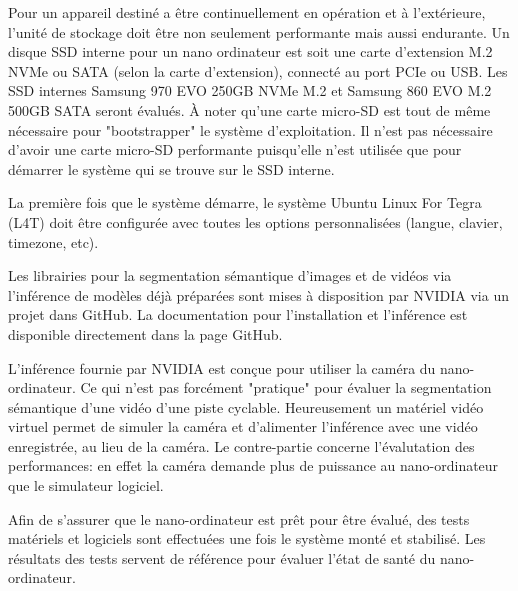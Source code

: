 \par Pour un appareil destiné a être continuellement en opération et à l'extérieure, l'unité de stockage doit être non seulement performante mais aussi endurante. Un disque SSD interne pour un nano ordinateur est soit une carte d'extension M.2 NVMe ou SATA (selon la carte d'extension), connecté au port PCIe ou USB. Les SSD internes 
Samsung 970 EVO 250GB NVMe M.2 et Samsung 860 EVO M.2 500GB SATA seront évalués. À noter qu'une carte micro-SD est tout de même nécessaire pour "bootstrapper" le système d'exploitation. Il n'est pas nécessaire d'avoir une carte micro-SD performante puisqu'elle n'est utilisée que pour démarrer le système qui se trouve sur le SSD interne. 
\par La première fois que le système démarre, le système Ubuntu Linux For Tegra (L4T) doit être configurée avec toutes les options personnalisées (langue, clavier, timezone, etc).
\par Les librairies pour la segmentation sémantique 
d'images et de vidéos via l'inférence de modèles déjà préparées sont mises à disposition par NVIDIA via un projet dans GitHub. La documentation pour l'installation et l'inférence est disponible directement dans la page GitHub. 
\par L'inférence fournie par NVIDIA est conçue pour utiliser la caméra du nano-ordinateur. Ce qui n'est pas forcément "pratique" pour évaluer la segmentation sémantique d'une vidéo d'une piste cyclable. Heureusement un matériel vidéo virtuel permet de simuler la caméra et d'alimenter l'inférence avec une vidéo enregistrée, au lieu de la caméra. Le contre-partie concerne l'évalutation des performances:  en effet la caméra demande plus de puissance au nano-ordinateur que le simulateur logiciel.
\par Afin de s'assurer que le nano-ordinateur est prêt pour être évalué, des tests matériels et logiciels sont  effectuées une fois le système monté et stabilisé. Les résultats des tests servent de référence pour évaluer l'état de santé du nano-ordinateur. 
